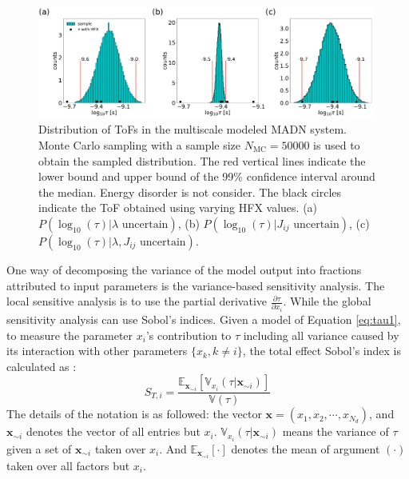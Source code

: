 \documentclass[letterpaper,12pt]{article}
\begin{document}
%
\begin{figure}[H]
    \centering
    \includegraphics[width=0.99\textwidth]{figs/fig_mle_MADN_noE.pdf}
    \caption{Distribution of ToFs in the multiscale modeled MADN system.
    Monte Carlo sampling with a sample size $N_\text{MC}=50000$ is used to obtain the sampled distribution. The red vertical lines indicate the lower bound and upper bound of the 99\% confidence interval around the median.
    Energy disorder is not consider. 
    The black circles indicate the ToF obtained using varying HFX values.
    (a) $P(\log_{10}(\tau)|\lambda \text{ uncertain})$, 
    (b) $P(\log_{10}(\tau)|J_{ij} \text{ uncertain})$, 
    (c) $P(\log_{10}(\tau)|\lambda, J_{ij} \text{ uncertain})$. }
    \label{fig:mle_MADN_noE}
\end{figure}
%


One way of decomposing the variance of the model output into fractions attributed to input parameters is the variance-based sensitivity analysis. The local sensitive analysis is to use the partial derivative $\frac{\partial \tau}{\partial x_i}$. While the global sensitivity analysis can use Sobol's indices. Given a model of Equation \ref{eq:tau1}, to measure the parameter $x_i$'s contribution to $\tau$ including all variance caused by its interaction with other parameters $\{x_k, k \neq i \}$, the total effect Sobol's index is calculated as \cite{saltelli_variance_2010}:
\begin{equation}
    S_{T,i} = \frac{ \mathbb{E}_{\mathbf{x}_{\sim i}}[ \mathbb{V}_{x_i}(\tau|\mathbf{x}_{\sim i}) ] }{ \mathbb{V}(\tau) }
    \label{eq:STi}
\end{equation}
The details of the notation is as followed: the vector $\mathbf{x}=(x_1, x_2, \cdots, x_{N_d})$, and $\mathbf{x}_{\sim i}$ denotes the vector of all entries but $x_i$. 
$\mathbb{V}_{x_i}(\tau|\mathbf{x}_{\sim i})$ means the variance of $\tau$ given a set of $\mathbf{x}_{\sim i}$ taken over $x_i$. And $ \mathbb{E}_{\mathbf{x}_{\sim i}}[\cdot]$ denotes the mean of argument $(\cdot)$ taken over all factors but $x_i$.
\end{document}
